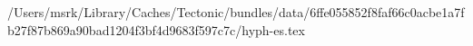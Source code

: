 /Users/msrk/Library/Caches/Tectonic/bundles/data/6ffe055852f8faf66c0acbe1a7fb27f87b869a90bad1204f3bf4d9683f597c7c/hyph-es.tex